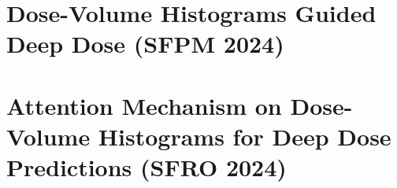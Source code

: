 \section{Dose-Volume Histograms Guided Deep Dose (SFPM 2024)}

\section{Attention Mechanism on Dose-Volume Histograms for Deep Dose Predictions (SFRO 2024)}
